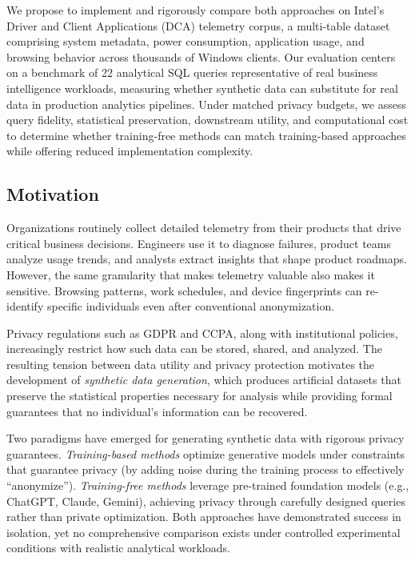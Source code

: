 \documentclass[12pt,letterpaper]{article}
\renewcommand{\_}{\textunderscore\allowbreak}
\begin{document}
We propose to implement and rigorously compare both approaches on Intel's Driver and Client Applications (DCA) telemetry corpus, a multi-table dataset comprising system metadata, power consumption, application usage, and browsing behavior across thousands of Windows clients. Our evaluation centers on a benchmark of 22 analytical SQL queries representative of real business intelligence workloads, measuring whether synthetic data can substitute for real data in production analytics pipelines. Under matched privacy budgets, we assess query fidelity, statistical preservation, downstream utility, and computational cost to determine whether training-free methods can match training-based approaches while offering reduced implementation complexity.


\subsection{Motivation}

Organizations routinely collect detailed telemetry from their products that drive critical business decisions. Engineers use it to diagnose failures, product teams analyze usage trends, and analysts extract insights that shape product roadmaps. However, the same granularity that makes telemetry valuable also makes it sensitive. Browsing patterns, work schedules, and device fingerprints can re-identify specific individuals even after conventional anonymization.

Privacy regulations such as GDPR and CCPA, along with institutional policies, increasingly restrict how such data can be stored, shared, and analyzed. The resulting tension between data utility and privacy protection motivates the development of \textit{synthetic data generation}, which produces artificial datasets that preserve the statistical properties necessary for analysis while providing formal guarantees that no individual's information can be recovered.

Two paradigms have emerged for generating synthetic data with rigorous privacy guarantees. \textit{Training-based methods} optimize generative models under constraints that guarantee privacy (by adding noise during the training process to effectively ``anonymize''). \textit{Training-free methods} leverage pre-trained foundation models (e.g., ChatGPT, Claude, Gemini), achieving privacy through carefully designed queries rather than private optimization. Both approaches have demonstrated success in isolation, yet no comprehensive comparison exists under controlled experimental conditions with realistic analytical workloads.
\end{document}
